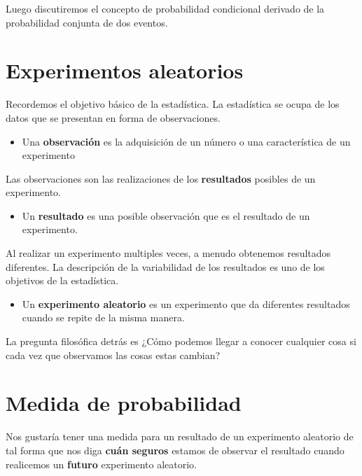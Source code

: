 \documentclass[
]{book}
\providecommand{\tightlist}{%
  \setlength{\itemsep}{0pt}\setlength{\parskip}{0pt}}
\begin{document}
Luego discutiremos el concepto de probabilidad condicional derivado de la probabilidad conjunta de dos eventos.

\hypertarget{experimentos-aleatorios-1}{%
\section{Experimentos aleatorios}\label{experimentos-aleatorios-1}}

Recordemos el objetivo básico de la estadística. La estadística se ocupa de los datos que se presentan en forma de observaciones.

\begin{itemize}
\tightlist
\item
  Una \textbf{observación} es la adquisición de un número o una característica de un experimento
\end{itemize}

Las observaciones son las realizaciones de los \textbf{resultados} posibles de un experimento.

\begin{itemize}
\tightlist
\item
  Un \textbf{resultado} es una posible observación que es el resultado de un experimento.
\end{itemize}

Al realizar un experimento multiples veces, a menudo obtenemos resultados diferentes. La descripción de la variabilidad de los resultados es uno de los objetivos de la estadística.

\begin{itemize}
\tightlist
\item
  Un \textbf{experimento aleatorio} es un experimento que da diferentes resultados cuando se repite de la misma manera.
\end{itemize}

La pregunta filosófica detrás es ¿Cómo podemos llegar a conocer cualquier cosa si cada vez que observamos las cosas estas cambian?

\hypertarget{medida-de-probabilidad}{%
\section{Medida de probabilidad}\label{medida-de-probabilidad}}

Nos gustaría tener una medida para un resultado de un experimento aleatorio de tal forma que nos diga \textbf{cuán seguros} estamos de observar el resultado cuando realicemos un \textbf{futuro} experimento aleatorio.
\end{document}
